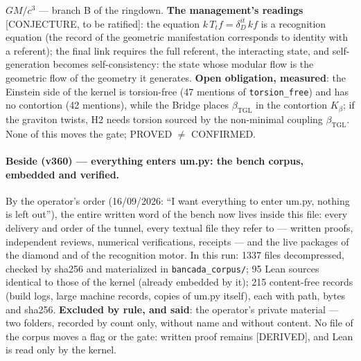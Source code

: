 \documentclass[11pt]{article}
\newcommand{\bTGL}{\beta_{\mathrm{TGL}}}\newcommand{\Msun}{M_{\odot}}\newcommand{\TGL}{\mathrm{TGL}}
\theoremstyle{definition}\newtheorem{deriv}{Derivation}
\begin{document}
$GM/c^3$ --- branch B of the ringdown. \textbf{The management's readings} [CONJECTURE, to be ratified]: the equation $k\,T_t f=\delta_D^{it}\,k f$ is a recognition equation (the record of the geometric manifestation corresponds to identity with a referent); the final link requires the full referent, the interacting state, and self-generation becomes self-consistency: the state whose modular flow is the geometric flow of the geometry it generates. \textbf{Open obligation, measured}: the Einstein side of the kernel is torsion-free (47 mentions of \texttt{torsion\_free}) and has no contortion (42 mentions), while the Bridge places $\bTGL$ in the contortion $K_\beta$; if the graviton twists, H2 needs torsion sourced by the non-minimal coupling $\bTGL$. None of this moves the gate; PROVED $\neq$ CONFIRMED.

\paragraph*{Beside (v360) --- everything enters um.py: the bench corpus, embedded and verified.} By the operator's order (16/09/2026: ``I want everything to enter um.py, nothing is left out''), the entire written word of the bench now lives inside this file: every delivery and order of the tunnel, every textual file they refer to --- written proofs, independent reviews, numerical verifications, receipts --- and the live packages of the diamond and of the recognition motor. In this run: 1337 files decompressed, checked by sha256 and materialized in \texttt{bancada\_corpus/}; 95 Lean sources identical to those of the kernel (already embedded by it); 215 content-free records (build logs, large machine records, copies of um.py itself), each with path, bytes and sha256. \textbf{Excluded by rule, and said}: the operator's private material --- two folders, recorded by count only, without name and without content. No file of the corpus moves a flag or the gate: written proof remains [DERIVED], and Lean is read only by the kernel.
\end{document}
